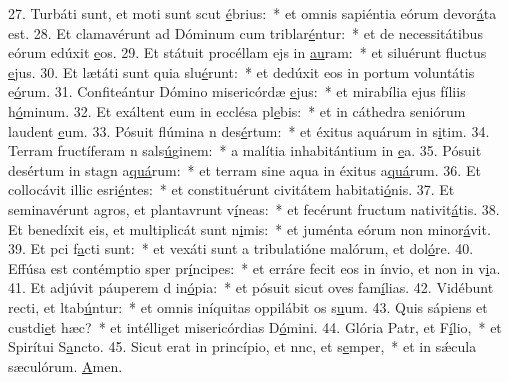 27. Turbáti sunt, et moti sunt scut \uline{é}brius:~* et omnis sapiéntia eórum devor\uline{á}ta est.
28. Et clamavérunt ad Dóminum cum triblar\uline{é}ntur:~* et de necessitátibus eórum edúxit \uline{e}os.
29. Et státuit procéllam ejs in \uline{au}ram:~* et siluérunt fluctus \uline{e}jus.
30. Et lætáti sunt quia slu\uline{é}runt:~* et dedúxit eos in portum voluntátis e\uline{ó}rum.
31. Confiteántur Dómino misericórdæ \uline{e}jus:~* et mirabília ejus fíliis h\uline{ó}minum.
32. Et exáltent eum in ecclésa pl\uline{e}bis:~* et in cáthedra seniórum laudent \uline{e}um.
33. Pósuit flúmina n des\uline{é}rtum:~* et éxitus aquárum in s\uline{i}tim.
34. Terram fructíferam n sals\uline{ú}ginem:~* a malítia inhabitántium in \uline{e}a.
35. Pósuit desértum in stagn a\uline{quá}rum:~* et terram sine aqua in éxitus a\uline{quá}rum.
36. Et collocávit illic esri\uline{é}ntes:~* et constituérunt civitátem habitati\uline{ó}nis.
37. Et seminavérunt agros, et plantavrunt v\uline{í}neas:~* et fecérunt fructum nativit\uline{á}tis.
38. Et benedíxit eis, et multiplicát sunt n\uline{i}mis:~* et juménta eórum non minor\uline{á}vit.
39. Et pci f\uline{a}cti sunt:~* et vexáti sunt a tribulatióne malórum, et dol\uline{ó}re.
40. Effúsa est contémptio sper pr\uline{í}ncipes:~* et erráre fecit eos in ínvio, et non in v\uline{i}a.
41. Et adjúvit páuperem d in\uline{ó}pia:~* et pósuit sicut oves fam\uline{í}lias.
42. Vidébunt recti, et ltab\uline{ú}ntur:~* et omnis iníquitas oppilábit os s\uline{u}um.
43. Quis sápiens et custdi\uline{e}t hæc?~* et intélliget misericórdias D\uline{ó}mini.
44. Glória Patr, et F\uline{í}lio,~* et Spirítui S\uline{a}ncto.
45. Sicut erat in princípio, et nnc, et s\uline{e}mper,~* et in sǽcula sæculórum. \uline{A}men.
